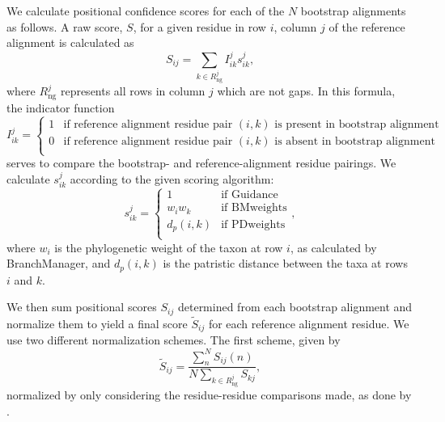\documentclass[10pt]{article}
\begin{document}
We calculate positional confidence scores for each of the $N$ bootstrap alignments as follows. A raw score, $S$, for a given residue in row $i$, column $j$ of the reference alignment is calculated as \begin{equation} S_{ij} = \sum\limits_{k \in R_\text{ng}^j} I_{ik}^j s_{ik}^j    ,\end{equation} where $R_\text{ng}^j$ represents all rows in column $j$ which are not gaps.
In this formula, the indicator function 
\begin{equation}I_{ik}^j = \left\{ \begin{array}{rl}

              1                         &\mbox{if reference alignment residue pair $(i, k)$ is present in bootstrap alignment} \\
              0            &\mbox{if reference alignment residue pair $(i, k)$ is absent in bootstrap alignment} \\
                     \end{array} \right. 
\end{equation}
serves to compare the bootstrap- and reference-alignment residue pairings.
We calculate $s_{ik}^j$ according to the given scoring algorithm:
\begin{equation}
s_{ik}^j = \left\{ \begin{array}{rl}

              1                         &\mbox{if Guidance} \\
              w_iw_k              &\mbox{if BMweights} \\
              d_p(i,k)              &\mbox{if PDweights} \\
                     \end{array} \right.,
\end{equation} where $w_i$ is the phylogenetic weight of the taxon at row $i$, as calculated by BranchManager, and $d_p(i, k)$ is the patristic distance between the taxa at rows $i$ and $k$. 

We then sum positional scores $S_{ij}$ determined from each bootstrap alignment and normalize them to yield a final score $\widetilde{S}_{ij}$ for each reference alignment residue. We use two different normalization schemes. The first scheme, given by \begin{equation} \widetilde{S}_{ij} = \frac{\sum_{n}^N S_{ij}(n)}{N\sum_{k \in R_\text{ng}^j} S_{kj}}, \end{equation} normalized by only considering the residue-residue comparisons made, as done by \citep{Penn2010}. 
\end{document}
